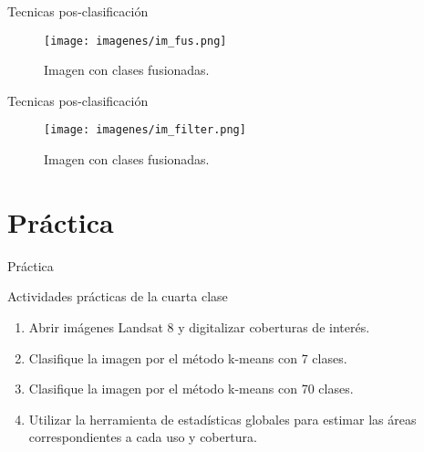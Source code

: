 \documentclass[handout]{beamer}
\begin{document}
\begin{frame}{Tecnicas pos-clasificaci\'on}
  \begin{figure}
    \texttt{[image: imagenes/im\_fus.png]}
    \caption{Imagen con clases fusionadas.}
  \end{figure}
\end{frame}

\begin{frame}{Tecnicas pos-clasificaci\'on}
  \begin{figure}
    \texttt{[image: imagenes/im\_filter.png]}
    \caption{Imagen con clases fusionadas.}
  \end{figure}
\end{frame}

\section{Pr\'actica}

\begin{frame}{Pr\'actica}
  \begin{exampleblock}{Actividades pr\'acticas de la cuarta clase}
    \begin{enumerate}[<+>]
      \item Abrir im\'agenes Landsat 8 y digitalizar coberturas de inter\'es.
      \item Clasifique la imagen por el método k-means con 7 clases.
      \item Clasifique la imagen por el método k-means con 70 clases.
      \item Utilizar la herramienta de estad\'isticas globales para estimar las \'areas correspondientes a cada uso y cobertura.
    \end{enumerate}
  \end{exampleblock}
\end{frame}
\end{document}

